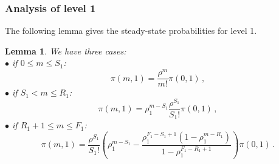 \documentclass[conference]{IEEEtran}
\newtheorem{lem}{Lemma}
\begin{document}
\subsubsection{Analysis of level 1}
The following lemma gives the steady-state probabilities for level 1.
\begin{lem}
We have three cases:\\
$\bullet$ if $0\leq m \leq S_1$:
\begin{equation}
 \pi(m,1)=\frac{\rho^{m}}{m!} \pi(0,1) \, ,
\label{eq1a}
 \end{equation}
$\bullet$ if $S_1<  m \leq R_1$:
\begin{equation}
 \pi(m,1)=\rho_1^{m-S_1} \frac{\rho^{S_1}}{S_1!}\pi(0,1) \, ,
 \label{eq1b}
 \end{equation}
$\bullet$ if $R_1+1 \leq m \leq  F_1$:
\begin{equation}
\pi(m,1)= \frac{\rho^{S_1}}{S_1!}(\rho_1^{m-S_1}- \frac{ \rho_1^{F_1-S_1+1} (1-\rho_1^{m-R_1})} {1-\rho_1^{F_1-R_1+1}}) \pi(0,1) \, .
\label{eq1c}
\end{equation}
\end{lem}
\end{document}
